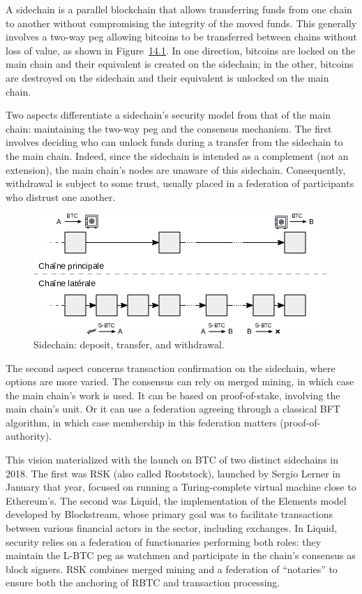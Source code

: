 \documentclass[
  a5paper,
  smalldemyvopaper,10pt,twoside,onecolumn,openright,extrafontsizes,hidelinks]{memoir}
\begin{document}
A sidechain is a parallel blockchain that allows transferring funds from
one chain to another without compromising the integrity of the moved
funds. This generally involves a two-way peg allowing bitcoins to be
transferred between chains without loss of value, as shown in
Figure~\hyperref[fig:sidechain-two-way-peg]{14.1}. In one direction,
bitcoins are locked on the main chain and their equivalent is created on
the sidechain; in the other, bitcoins are destroyed on the sidechain and
their equivalent is unlocked on the main chain.

Two aspects differentiate a sidechain's security model from that of the
main chain: maintaining the two-way peg and the consensus mechanism. The
first involves deciding who can unlock funds during a transfer from the
sidechain to the main chain. Indeed, since the sidechain is intended as
a complement (not an extension), the main chain's nodes are unaware of
this sidechain. Consequently, withdrawal is subject to some trust,
usually placed in a federation of participants who distrust one another.

\begin{figure}

{\centering \includegraphics{chapters/img/sidechain-two-way-peg.png}

}

\caption{Sidechain: deposit, transfer, and withdrawal.}

\end{figure}%

The second aspect concerns transaction confirmation on the sidechain,
where options are more varied. The consensus can rely on merged mining,
in which case the main chain's work is used. It can be based on
proof-of-stake, involving the main chain's unit. Or it can use a
federation agreeing through a classical BFT algorithm, in which case
membership in this federation matters (proof-of-authority).

This vision materialized with the launch on BTC of two distinct
sidechains in 2018. The first was RSK (also called Rootstock), launched
by Sergio Lerner in January that year, focused on running a
Turing-complete virtual machine close to Ethereum's. The second was
Liquid, the implementation of the Elements model developed by
Blockstream, whose primary goal was to facilitate transactions between
various financial actors in the sector, including exchanges. In Liquid,
security relies on a federation of functionaries performing both roles:
they maintain the L-BTC peg as watchmen and participate in the chain's
consensus as block signers. RSK combines merged mining and a federation
of ``notaries'' to ensure both the anchoring of RBTC and transaction
processing.
\end{document}
